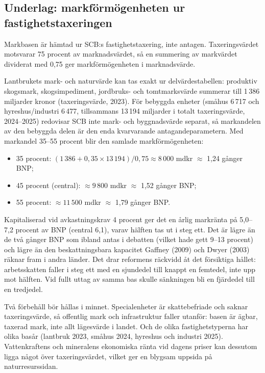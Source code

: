 \documentclass[11pt]{article}
\begin{document}
\subsection*{Underlag: markförmögenheten ur fastighetstaxeringen}

Markbasen är hämtad ur SCB:s fastighetstaxering, inte antagen. Taxeringsvärdet motsvarar 75 procent av marknadsvärdet, så en summering av markvärdet dividerat med 0,75 ger markförmögenheten i marknadsvärde.

Lantbrukets mark- och naturvärde kan tas exakt ur delvärdestabellen: produktiv skogsmark, skogsimpediment, jordbruks- och tomtmarksvärde summerar till 1\,386 miljarder kronor (taxeringsvärde, 2023). För bebyggda enheter (småhus 6\,717 och hyreshus/industri 6\,477, tillsammans 13\,194 miljarder i totalt taxeringsvärde, 2024--2025) redovisar SCB inte mark- och byggnadsvärde separat, så markandelen av den bebyggda delen är den enda kvarvarande antagandeparametern. Med markandel 35--55 procent blir den samlade markförmögenheten:

\begin{itemize}
\item 35 procent: $(1\,386 + 0{,}35 \times 13\,194)/0{,}75 \approx 8\,000$ mdkr $\approx$ 1,24 gånger BNP;
\item 45 procent (central): $\approx 9\,800$ mdkr $\approx$ 1,52 gånger BNP;
\item 55 procent: $\approx 11\,500$ mdkr $\approx$ 1,79 gånger BNP.
\end{itemize}

Kapitaliserad vid avkastningskrav 4 procent ger det en årlig markränta på 5,0--7,2 procent av BNP (central 6,1), varav hälften tas ut i steg ett. Det är lägre än de två gånger BNP som ibland antas i debatten (vilket hade gett 9--13 procent) och lägre än den beskattningsbara kapacitet Gaffney (2009) och Dwyer (2003) räknar fram i andra länder. Det drar reformens räckvidd åt det försiktiga hållet: arbetsskatten faller i steg ett med en sjundedel till knappt en femtedel, inte upp mot hälften. Vid fullt uttag av samma bas skulle sänkningen bli en fjärdedel till en tredjedel.

Två förbehåll bör hållas i minnet. Specialenheter är skattebefriade och saknar taxeringsvärde, så offentlig mark och infrastruktur faller utanför: basen är ägbar, taxerad mark, inte allt lägesvärde i landet. Och de olika fastighetstyperna har olika basår (lantbruk 2023, småhus 2024, hyreshus och industri 2025). Vattenkraftens och mineralens ekonomiska ränta vid dagens priser kan dessutom ligga något över taxeringsvärdet, vilket ger en blygsam uppsida på naturresurssidan.
\end{document}
